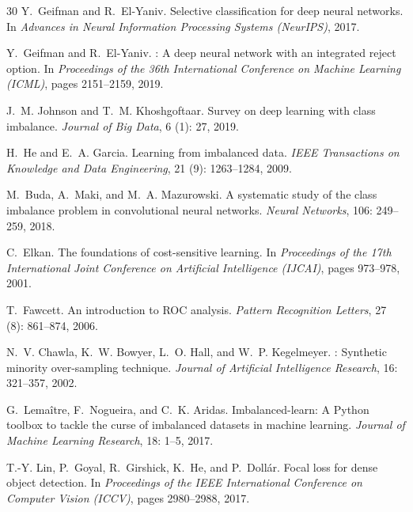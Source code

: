 \documentclass[12pt,a4paper]{article}
\begin{document}
\begin{thebibliography}{30}
Y.~Geifman and R.~El-Yaniv.
\newblock Selective classification for deep neural networks.
\newblock In \emph{Advances in Neural Information Processing Systems
  (NeurIPS)}, 2017.

Y.~Geifman and R.~El-Yaniv.
: A deep neural network with an integrated reject
  option.
\newblock In \emph{Proceedings of the 36th International Conference on Machine
  Learning (ICML)}, pages 2151--2159, 2019.

J.~M. Johnson and T.~M. Khoshgoftaar.
\newblock Survey on deep learning with class imbalance.
\newblock \emph{Journal of Big Data}, 6 (1): 27, 2019.

H.~He and E.~A. Garcia.
\newblock Learning from imbalanced data.
\newblock \emph{IEEE Transactions on Knowledge and Data Engineering},
  21 (9): 1263--1284, 2009.

M.~Buda, A.~Maki, and M.~A. Mazurowski.
\newblock A systematic study of the class imbalance problem in convolutional
  neural networks.
\newblock \emph{Neural Networks}, 106: 249--259, 2018.

C.~Elkan.
\newblock The foundations of cost-sensitive learning.
\newblock In \emph{Proceedings of the 17th International Joint Conference on
  Artificial Intelligence (IJCAI)}, pages 973--978, 2001.

T.~Fawcett.
\newblock An introduction to {ROC} analysis.
\newblock \emph{Pattern Recognition Letters}, 27 (8):
  861--874, 2006.

N.~V. Chawla, K.~W. Bowyer, L.~O. Hall, and W.~P. Kegelmeyer.
: Synthetic minority over-sampling technique.
\newblock \emph{Journal of Artificial Intelligence Research}, 16:
  321--357, 2002.

G.~Lema\^{i}tre, F.~Nogueira, and C.~K. Aridas.
\newblock Imbalanced-learn: A {Python} toolbox to tackle the curse of
  imbalanced datasets in machine learning.
\newblock \emph{Journal of Machine Learning Research}, 18: 1--5, 2017.

T.-Y. Lin, P.~Goyal, R.~Girshick, K.~He, and P.~Doll\'{a}r.
\newblock Focal loss for dense object detection.
\newblock In \emph{Proceedings of the IEEE International Conference on Computer
  Vision (ICCV)}, pages 2980--2988, 2017.


\end{thebibliography}
\end{document}
